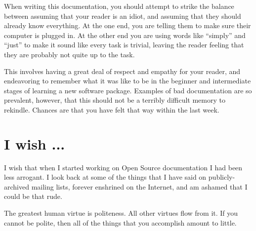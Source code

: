 When writing this documentation, you should attempt to strike the balance
between assuming that your reader is an idiot, and assuming that they should
already know everything. At the one end, you are telling them to make sure their
computer is plugged in. At the other end you are using words like ``simply'' and
``just'' to make it sound like every task is trivial, leaving the reader feeling
that they are probably not quite up to the task.

This involves having a great deal of respect and empathy for your reader, and
endeavoring to remember what it was like to be in the beginner and intermediate
stages of learning a new software package. Examples of bad documentation are so
prevalent, however, that this should not be a terribly difficult memory to
rekindle. Chances are that you have felt that way within the last week.

\section*{I wish ...}
I wish that when I started working on Open Source documentation I had been less
arrogant. I look back at some of the things that I have said on
publicly-archived mailing lists, forever enshrined on the Internet, and am
ashamed that I could be that rude.

The greatest human virtue is politeness. All other virtues flow from it. If you
cannot be polite, then all of the things that you accomplish amount to little.
